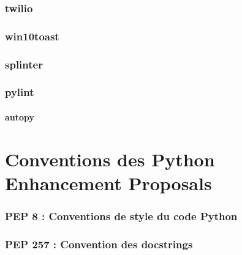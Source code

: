\documentclass[a4paper, 10pt]{article}
\begin{document}
\section{twilio}
\section{win10toast}
\section{splinter}
\section{pylint}

\subsection{autopy}

\part{Conventions des Python Enhancement Proposals}
\section{PEP 8 : Conventions de style du code Python}
\section{PEP 257 : Convention des docstrings}



\printindex
\end{document}
